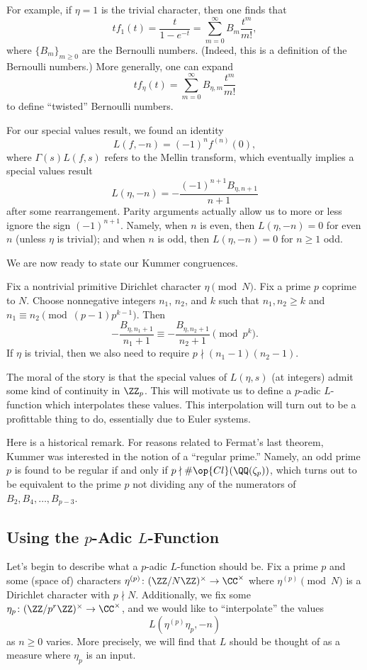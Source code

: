 \documentclass{article}
\begin{document}
For example, if $\eta=1$ is the trivial character, then one finds that
\[tf_1(t)=\frac t{1-e^{-t}}=\sum_{m=0}^\infty B_m\frac{t^m}{m!},\]
where $\{B_m\}_{m\ge0}$ are the Bernoulli numbers. (Indeed, this is a definition of the Bernoulli numbers.) More generally, one can expand
\[tf_\eta(t)=\sum_{m=0}^\infty B_{\eta,m}\frac{t^m}{m!}\]
to define ``twisted'' Bernoulli numbers.

For our special values result, we found an identity
\[L(f,-n)=(-1)^nf^{(n)}(0),\]
where $\Gamma(s)L(f,s)$ refers to the Mellin transform, which eventually implies a special values result
\[L(\eta,-n)=-\frac{(-1)^{n+1}B_{\eta,n+1}}{n+1}\]
after some rearrangement. Parity arguments actually allow us to more or less ignore the sign $(-1)^{n+1}$. Namely, when $n$ is even, then $L(\eta,-n)=0$ for even $n$ (unless $\eta$ is trivial); and when $n$ is odd, then $L(\eta,-n)=0$ for $n\ge1$ odd.

We are now ready to state our Kummer congruences.
\begin{theorem} \label{thm:kummer-cong}
	Fix a nontrivial primitive Dirichlet character $\eta\pmod N$. Fix a prime $p$ coprime to $N$. Choose nonnegative integers $n_1$, $n_2$, and $k$ such that $n_1,n_2\ge k$ and $n_1\equiv n_2\pmod{(p-1)p^{k-1}}$. Then
	\[-\frac{B_{\eta,n_1+1}}{n_1+1}\equiv-\frac{B_{\eta,n_2+1}}{n_2+1}\pmod{p^k}.\]
	If $\eta$ is trivial, then we also need to require $p\nmid(n_1-1)(n_2-1)$.
\end{theorem}
The moral of the story is that the special values of $L(\eta,s)$ (at integers) admit some kind of continuity in $\ZZ_p$. This will motivate us to define a $p$-adic $L$-function which interpolates these values. This interpolation will turn out to be a profittable thing to do, essentially due to Euler systems.
\begin{remark}
	Here is a historical remark. For reasons related to Fermat's last theorem, Kummer was interested in the notion of a ``regular prime.'' Namely, an odd prime $p$ is found to be regular if and only if $p\nmid\#\op{Cl}(\QQ(\zeta_p))$, which turns out to be equivalent to the prime $p$ not dividing any of the numerators of $B_2,B_4,\ldots,B_{p-3}$.
\end{remark}

\subsection{Using the \texorpdfstring{$p$}{p}-Adic \texorpdfstring{$L$}{L}-Function}
Let's begin to describe what a $p$-adic $L$-function should be. Fix a prime $p$ and some (space of) characters $\eta^{(p)}\colon(\ZZ/N\ZZ)^\times\to\CC^\times$ where $\eta^{(p)}\pmod N$ is a Dirichlet character with $p\nmid N$. Additionally, we fix some $\eta_p\colon(\ZZ/p^r\ZZ)^\times\to\CC^\times$, and we would like to ``interpolate'' the values
\[L\left(\eta^{(p)}\eta_p,-n\right)\]
as $n\ge0$ varies. More precisely, we will find that $L$ should be thought of as a measure where $\eta_p$ is an input.
\end{document}
